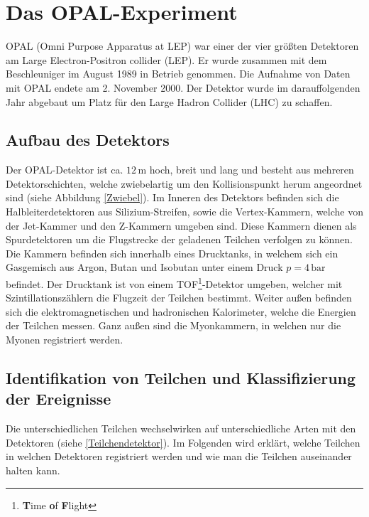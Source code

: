 \section{Das OPAL-Experiment}

OPAL (Omni Purpose Apparatus at LEP) war einer der vier größten Detektoren am Large Electron-Positron collider (LEP). Er wurde zusammen mit dem Beschleuniger im August 1989 in Betrieb genommen. Die Aufnahme von Daten mit OPAL endete am 2. November 2000. Der Detektor wurde im darauffolgenden Jahr abgebaut um Platz für den Large Hadron Collider (LHC) zu schaffen.\\


 

\subsection{Aufbau des Detektors}
Der OPAL-Detektor ist ca. $12\,\mathrm{m}$ hoch, breit und lang und besteht aus mehreren Detektorschichten, welche zwiebelartig um den Kollisionspunkt herum angeordnet sind (siehe Abbildung \ref{Zwiebel}). Im Inneren des Detektors befinden sich die Halbleiterdetektoren aus Silizium-Streifen, sowie die Vertex-Kammern, welche von der Jet-Kammer und den Z-Kammern umgeben sind. Diese Kammern dienen als Spurdetektoren um die Flugstrecke der geladenen Teilchen verfolgen zu können. Die Kammern befinden sich innerhalb eines Drucktanks, in welchem sich ein Gasgemisch aus Argon, Butan und Isobutan unter einem Druck $p=4\,\mathrm{bar}$ befindet. Der Drucktank ist von einem TOF\footnote{\textbf Time \textbf of \textbf Flight}-Detektor umgeben, welcher mit Szintillationszählern die Flugzeit der Teilchen bestimmt. Weiter außen befinden sich die elektromagnetischen und hadronischen Kalorimeter, welche die Energien der Teilchen messen. Ganz außen sind die Myonkammern, in welchen nur die Myonen registriert werden. \cite{anleitungalt}

\subsection{Identifikation von Teilchen und Klassifizierung der Ereignisse}
 
 Die unterschiedlichen Teilchen wechselwirken auf unterschiedliche Arten mit den Detektoren (siehe 
\ref{Teilchendetektor}). Im Folgenden wird erklärt, welche Teilchen in welchen Detektoren registriert werden und wie man die Teilchen auseinander halten kann.


